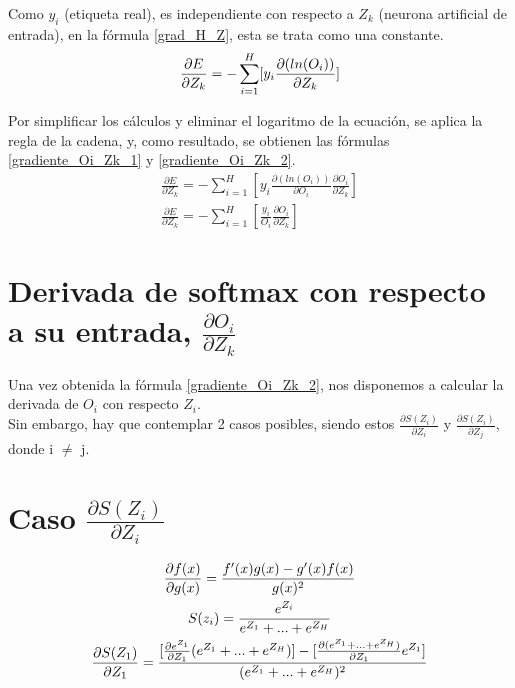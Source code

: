 Como $y_i$ (etiqueta real), es independiente con respecto a $Z_k$ (neurona artificial de entrada), en la fórmula \ref{grad_H_Z}, esta se trata como una constante. \\
\begin{gather}
	\frac{\partial E}{\partial Z_k} = - \sum_{i=1}^{H}  [y_i   \frac{\partial(ln(O_i))}{\partial Z_k}] \notag
\end{gather}

Por simplificar los cálculos y eliminar el logaritmo de la ecuación, se aplica la regla de la cadena, y, como resultado, se obtienen las fórmulas \ref{gradiente_Oi_Zk_1} y \ref{gradiente_Oi_Zk_2}.
\begin{gather}	
	\frac{\partial E}{\partial Z_k} = - \sum_{i=1}^{H}  [y_i   \frac{\partial(ln(O_i))}{\partial O_i}   \frac{\partial O_i}{\partial Z_k}]
	\label{gradiente_Oi_Zk_1} \\
	\frac{\partial E}{\partial Z_k} = - \sum_{i=1}^{H}  [\frac{y_i}{O_i}   \frac{\partial O_i}{\partial Z_k}] 
	\label{gradiente_Oi_Zk_2}
\end{gather}


\section{Derivada de softmax con respecto a su entrada, $\frac{\partial O_i}{\partial Z_k}$}

Una vez obtenida la fórmula \ref{gradiente_Oi_Zk_2}, nos disponemos a calcular la derivada de $O_i$ con respecto $Z_i$. \\
Sin embargo, hay que contemplar 2 casos posibles, siendo estos $\frac{\partial S(Z_i)}{\partial Z_i}$ y $\frac{\partial S(Z_i)}{\partial Z_j}$, donde i $\neq$ j. \\

\section{Caso $\frac{\partial S(Z_i)}{\partial Z_i}$}

\begin{gather}
	\frac{\partial f(x)}{\partial g(x)} = \frac{f'(x) g(x) - g'(x) f(x)}{g(x)^2} \\
	S(z_i) = \frac{e^{Z_i}}{e^{Z_1} + ... + e^{Z_H}} \notag \\
	\frac{\partial S(Z_1)}{\partial Z_1} = \frac{[\frac{\partial e^{Z_1}}{\partial Z_1}   (e^{Z_1} + ... + e^{Z_H}) ] - [\frac{\partial (e^{Z_1} + ... + e^{Z_H})}{\partial Z_1}   e^{Z_1} ] }{(e^{Z_1} + ... + e^{Z_H})^2} \notag
\end{gather}

